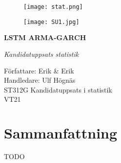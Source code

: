 \documentclass[12pt]{article}
\begin{document}
\begin{titlepage}
\thispagestyle{empty}
	\begin{figure}[ht]
			\texttt{[image: stat.png]}
			
	   \endminipage
		 \texttt{[image: SU1.jpg]}
			
\endminipage
\end{figure}
	
	
\centering
\vspace{5cm}

{\large\bfseries LSTM ARMA-GARCH\par}
	\vspace{0.5cm}
	
{\large\itshape Kandidatuppsats statistik \par}
	\vfill
	
\begin{flushleft}
Författare: Erik \& Erik \\
Handledare: Ulf Högnäs\\
ST312G Kandidatuppsats i statistik \\
VT21
\end{flushleft}
\end{titlepage}


\newpage
\thispagestyle{empty}
\section*{Sammanfattning}
TODO

\newpage
\tableofcontents
\newpage

\begin{comment}
Hej igen!

Här kommer vårat först utkast. Säg gärna till när du haft möjlighet att hunnit läsa igenom det och kan ta ett videomöte.

Det förekommer definitivt slarvel (formalia, ekvationer som har fel namn osv) men vi har inte prioriterat att fixa dessa just nu, utan tar det inför slutinlämningen (det lär ändå hinna ändras).

Två frågor vi vill skicka med är:
- Vad tycker du vi kan utveckla för att ta detta till nästa nivå? Det känns som vi har både tid och plats för det.
- En idé vi har är att simulera en trading-strategi likt http://cs230.stanford.edu/projects_winter_2020/reports/32066186.pdf, för att se vilken av modellerna som hade varit bäst att tradea med. Det ger också mer relaterbara resultat eftersom vi kan sätta ett pengavärde på hur bra modellerna presterar. Vad tror du om det? 

Ser fram emot din feedback!

Allt gott,

Erik & Erik
\end{comment}
\end{document}
